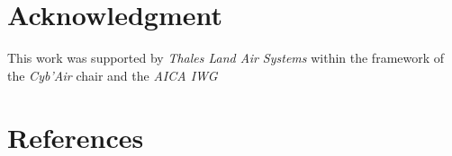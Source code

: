 \documentclass[conference]{IEEEtran}
\begin{document}



\section*{Acknowledgment}

This work was supported by \emph{Thales Land Air Systems} within the framework of the \emph{Cyb'Air} chair and the \emph{AICA IWG}

\section*{References}

% 



\end{document}

